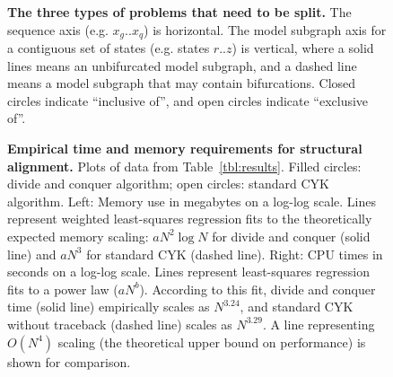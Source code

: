 \documentclass[11pt]{article}
\begin{document}
\begin{figure}[h]
\caption{\textbf{The three types of problems that need to be split.}
The sequence axis (e.g. $x_g..x_q$) is horizontal. The model subgraph
axis for a contiguous set of states (e.g. states $r..z$) is vertical,
where a solid lines means an unbifurcated model subgraph, and a dashed
line means a model subgraph that may contain bifurcations.  Closed
circles indicate ``inclusive of'', and open circles indicate
``exclusive of''.}
\label{fig:splitter_schematic}
\end{figure}

\begin{figure}[h]
\caption{\textbf{Empirical time and memory requirements for structural
alignment.} Plots of data from Table~\ref{tbl:results}. Filled
circles: divide and conquer algorithm; open circles: standard CYK
algorithm. Left: Memory use in megabytes on a log-log scale. Lines
represent weighted least-squares regression fits to the theoretically
expected memory scaling: $aN^2 \log N$ for divide and conquer (solid
line) and $aN^3$ for standard CYK (dashed line). Right: CPU times in
seconds on a log-log scale. Lines represent least-squares regression
fits to a power law ($aN^b$).  According to this fit, divide and
conquer time (solid line) empirically scales as $N^{3.24}$, and
standard CYK without traceback (dashed line) scales as $N^{3.29}$. A
line representing $O(N^4)$ scaling (the theoretical upper bound on
performance) is shown for comparison.}
\label{fig:graphs}
\end{figure}

\newpage



\fi
\end{document}
